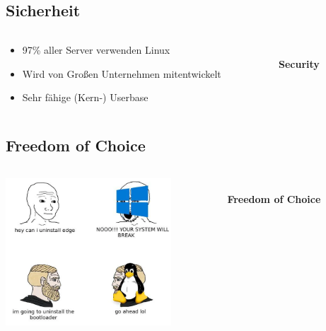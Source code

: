 \documentclass[
    ngerman,
    accentcolor=3b,
    dark_mode,
    fontsize= 12pt,
    a4paper,
    aspectratio=169,
    colorback=true,
    fancy_row_colors,
    leqno,
    fleqn,
    boxarc=3pt,
    fleqn,
]{algoslides}
\begin{document}
    \subsection{Sicherheit}
    \begin{frame}[c]
        \slidehead{}
        \begin{columns}
            \begin{column}[c]{0.5\textwidth}
                \begin{itemize}
                    \item 97\% aller Server verwenden Linux
                    \item Wird von Großen Unternehmen mitentwickelt
                    \item Sehr fähige (Kern-) Userbase
                \end{itemize}
            \end{column}
            \begin{column}[c]{0.5\textwidth}
                \begin{center}
                    \fontsize{50pt}{0pt}\selectfont\faShield*{}\\[0.2cm]
                    \normalsize\textbf{Security}
                \end{center}
            \end{column}
        \end{columns}
    \end{frame}
    \subsection{Freedom of Choice}
    \begin{frame}[c]%
        \slidehead{}%
        \begin{columns}%
            \begin{column}[c]{0.5\textwidth}%
                \centering\includegraphics[height=5.5cm]{freedom_of_choice_meme.png}%
            \end{column}%
            \begin{column}[c]{0.5\textwidth}
                \begin{center}
                    \fontsize{50pt}{0pt}\selectfont\faMagic{}\\[0.2cm]
                    \normalsize\textbf{Freedom of Choice}
                \end{center}
            \end{column}
        \end{columns}
    \end{frame}
\end{document}
